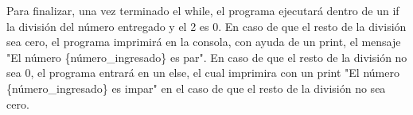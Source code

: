 \documentclass{article}
\begin{document}
\vspace{10pt}

\noindent Para finalizar, una vez terminado el while, el programa ejecutará dentro de un if la división del número entregado y el 2 es 0. En caso de que el resto de la división sea cero, el programa imprimirá en la consola, con ayuda de un print, el mensaje "El número \{número\_ingresado\} es par". En caso de que el resto de la división no sea 0, el programa entrará en un else, el cual imprimira con un print "El número \{número\_ingresado\} es impar" en el caso de que el resto de la división no sea cero.
\end{document}
